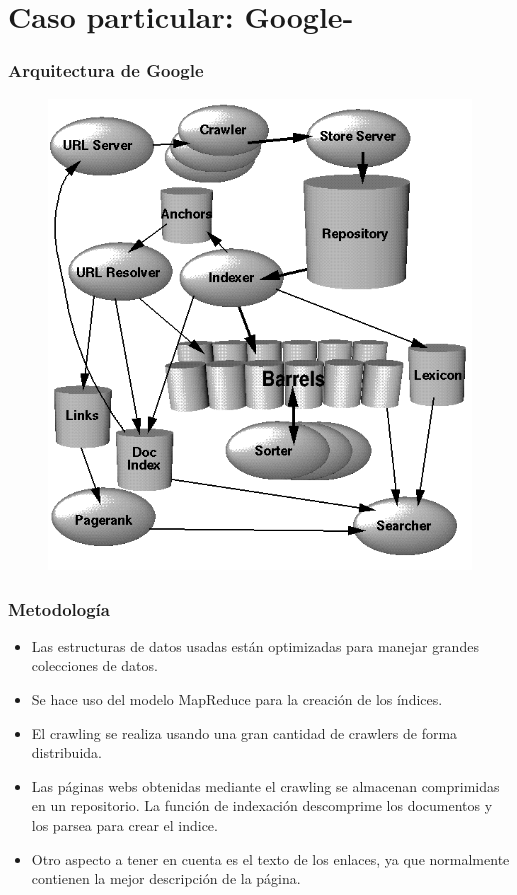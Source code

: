 \documentclass[9pt]{beamer} %
\begin{document}
\section{Caso particular: Google-}
\begin{frame}
	\frametitle{Arquitectura de Google}
	\begin{figure}
	\includegraphics[scale=0.33]{img/google_architecture.png}
\end{figure}
	\end{frame}
\begin{frame}
	\frametitle{Metodología}
\begin{itemize}
	\item Las estructuras de datos usadas están optimizadas para manejar grandes colecciones de datos.
	\item Se hace uso del modelo MapReduce para la creación de los índices.
	\item El crawling se realiza usando una gran cantidad de crawlers de forma distribuida.
	\item Las páginas webs obtenidas mediante el crawling se almacenan comprimidas en un repositorio. La función de indexación descomprime los documentos y los parsea para crear el indice.
	\item Otro aspecto a tener en cuenta es el texto de los enlaces, ya que normalmente contienen la mejor descripción de la página.
\end{itemize}
\end{frame}
\end{document}
